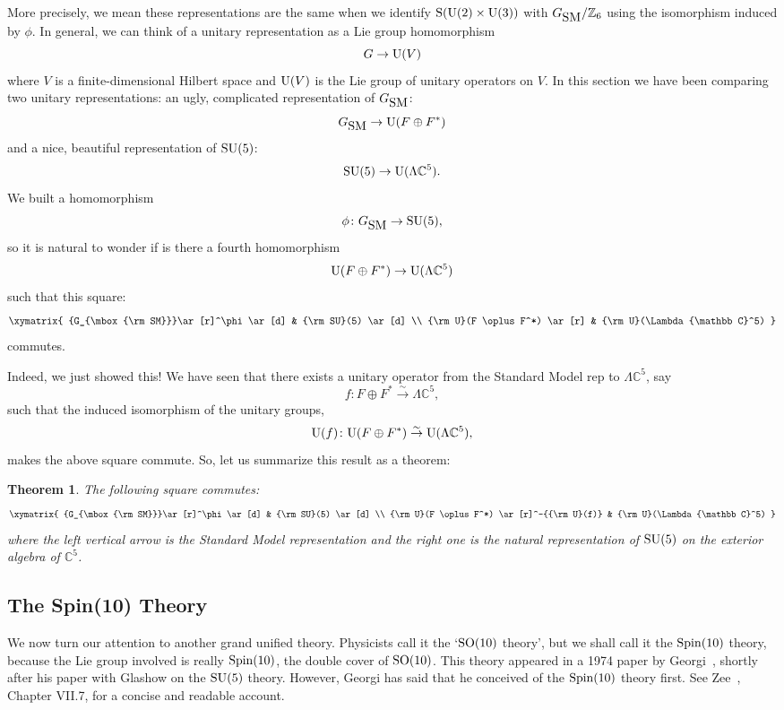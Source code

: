 \documentclass[12pt]{article}
\newcommand{\maps}{\colon}    %
\newcommand{\C}{{\mathbb C}}  %
\newcommand{\Z}{{\mathbb Z}}  %
\newcommand{\U}{{\rm U}}    %
\renewcommand{\S}{{\rm S}}    %
\newcommand{\SO}{{\rm SO}}    %
\newcommand{\SU}{{\rm SU}}    %
\newcommand{\Spin}{{\rm Spin}}    %
\newcommand{\Ex}{\Lambda} %
\newcommand{\GSM}{{G_{\mbox{\rm SM}}}}  %
\newcommand{\et}{\hspace{-0.08in}{\bf .}\hspace{0.1in}}
\newtheorem{thm}{Theorem}
\begin{document}
More precisely, we mean these representations are the same when we 
identify $\S(\U(2) \times \U(3))$ with $\GSM/\Z_6$ using the isomorphism 
induced by $\phi$. In general,
we can think of a unitary representation as a Lie group homomorphism
\[ G \to \U(V) \]
where $V$ is a finite-dimensional Hilbert space and $\U(V)$ is the 
Lie group of unitary operators on $V$.  
In this section we have been comparing two unitary representations:
an ugly, complicated representation of $\GSM$:
\[ \GSM \to \U(F \oplus F^*) \]
and a nice, beautiful representation of $\SU(5)$:
\[ \SU(5) \to \U(\Ex \C^5). \]
We built a homomorphism
\[ \phi \maps \GSM \to \SU(5), \]
so it is natural to wonder if is there a fourth homomorphism
\[ \U(F \oplus F^*) \to \U(\Ex \C^5) \]
such that this square:
\[
\xymatrix{
\GSM \ar[r]^\phi \ar[d] & \SU(5) \ar[d] \\
\U(F \oplus F^*) \ar[r] & \U(\Ex \C^5)
} 
\]
commutes.

Indeed, we just showed this!  We have seen that there exists a
unitary operator from the Standard Model rep to $\Ex \C^5$, say
\[ f \maps F \oplus F^* \stackrel{\sim}{\to} \Ex \C^5 , \]
such that the induced isomorphism of the unitary groups, 
\[ \U(f) \maps \U(F \oplus F^*) \stackrel{\sim}{\to} \U(\Ex \C^5), \] 
makes the above square commute.  So, let us summarize this result as a theorem:

\begin{thm}\et
\label{thm:su(5)}
	The following square commutes:
	\[
	\xymatrix{
	\GSM \ar[r]^\phi \ar[d] & \SU(5) \ar[d] \\
	\U(F \oplus F^*) \ar[r]^-{\U(f)} & \U(\Ex \C^5)
	}
	\]
where the left vertical arrow is the Standard Model representation
and the right one is the natural representation of $\SU(5)$ on
the exterior algebra of $\C^5$.
\end{thm}

\subsection{The Spin(10) Theory} \label{sec:so(10)}

We now turn our attention to another grand unified theory.  Physicists
call it the `$\SO(10)$ theory', but we shall call it the
$\Spin(10)$ theory, because the Lie group involved is really
$\Spin(10)$, the double cover of $\SO(10)$.  This theory appeared in a 
1974 paper by Georgi~\cite{georgi:so(10)}, shortly after his paper with
Glashow on the $\SU(5)$ theory.  However, Georgi has said that he conceived 
of the $\Spin(10)$ theory first.  See Zee~\cite{zee:nutshell}, Chapter VII.7, 
for a concise and readable account. 
\end{document}
